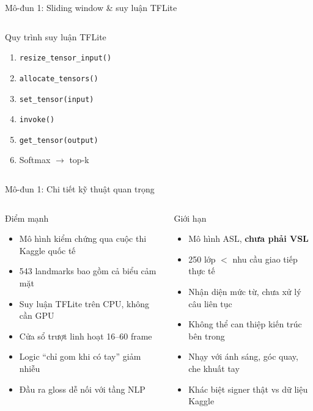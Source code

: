 ﻿\documentclass[aspectratio=169, 11pt]{beamer}
\begin{document}
\begin{frame}{Mô-đun 1: Sliding window \& suy luận TFLite}
\begin{columns}[T]
        \begin{block}{Quy trình suy luận TFLite}
            \begin{enumerate}\small
                \item \texttt{resize\_tensor\_input()}
                \item \texttt{allocate\_tensors()}
                \item \texttt{set\_tensor(input)}
                \item \texttt{invoke()}
                \item \texttt{get\_tensor(output)}
                \item Softmax $\rightarrow$ top-k
            \end{enumerate}
        \end{block}
    \end{columns}
\end{frame}

\begin{frame}{Mô-đun 1: Chi tiết kỹ thuật quan trọng}
    \begin{columns}[T]
        \begin{block}{Điểm mạnh}
            \begin{itemize}\small
                \item Mô hình kiểm chứng qua cuộc thi Kaggle quốc tế
                \item 543 landmarks bao gồm cả biểu cảm mặt
                \item Suy luận TFLite trên CPU, không cần GPU
                \item Cửa sổ trượt linh hoạt 16--60 frame
                \item Logic ``chỉ gom khi có tay'' giảm nhiễu
                \item Đầu ra gloss dễ nối với tầng NLP
            \end{itemize}
        \end{block}

        \begin{alertblock}{Giới hạn}
            \begin{itemize}\small
                \item Mô hình ASL, \textbf{chưa phải VSL}
                \item 250 lớp $<$ nhu cầu giao tiếp thực tế
                \item Nhận diện mức từ, chưa xử lý câu liên tục
                \item Không thể can thiệp kiến trúc bên trong
                \item Nhạy với ánh sáng, góc quay, che khuất tay
                \item Khác biệt signer thật vs dữ liệu Kaggle
            \end{itemize}
        \end{alertblock}
    \end{columns}
\end{frame}
\end{document}
